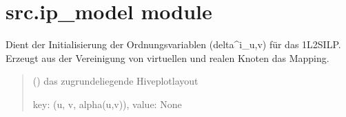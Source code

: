 \documentclass[a4paper,10pt,ngerman]{sphinxmanual}
\begin{document}
\section{src.ip\_model module}
\label{\detokenize{api:module-src.ip_model}}\label{\detokenize{api:src-ip-model-module}}

\begin{fulllineitems}
\label{\detokenize{api:src.ip_model.delta_mapping}}
\pysigstartsignatures
\pysiglinewithargsret
{}
{}
{}
\pysigstopsignatures
\sphinxAtStartPar
Dient der Initialisierung der Ordnungsvariablen (delta\textasciicircum{}i\_u,v) für das 1L2S\sphinxhyphen{}ILP. Erzeugt aus der Vereinigung von virtuellen und realen Knoten das Mapping.
\begin{quote}\begin{description}
\sphinxAtStartPar
{} ({\hyperref[\detokenize{api:src.hiveplot.HivePlotLayout}]{}}) \textendash{} das zugrundeliegende Hiveplotlayout

\sphinxAtStartPar
key: (u, v, alpha(u,v)), value: None

\sphinxAtStartPar
{}

\end{description}\end{quote}

\end{fulllineitems}

\end{document}
